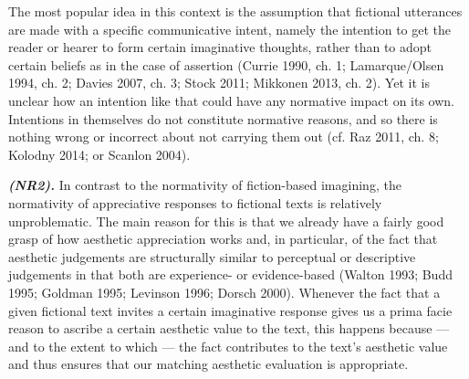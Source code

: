 The most popular idea in this context is the assumption that fictional utterances are made with a specific communicative intent, namely the intention to get the reader or hearer to form certain imaginative thoughts, rather than to adopt certain beliefs as in the case of assertion (Currie 1990, ch. 1; Lamarque/Olsen 1994, ch. 2; Davies 2007, ch. 3; Stock 2011; Mikkonen 2013, ch. 2). Yet it is unclear how an intention like that could have any normative impact on its own. Intentions in themselves do not constitute normative reasons, and so there is nothing wrong or incorrect about not carrying them out (cf. Raz 2011, ch. 8; Kolodny 2014; or Scanlon 2004).

\vspace{.2cm}
\noindent\textbf{\emph{(NR2).}} In contrast to the normativity of fiction-based imagining, the normativity of appreciative responses to fictional texts is relatively unproblematic. The main reason for this is that we already have a fairly good grasp of how aesthetic appreciation works and, in particular, of the fact that aesthetic judgements are structurally similar to perceptual or descriptive judgements in that both are experience- or evidence-based (Walton 1993; Budd 1995; Goldman 1995; Levinson 1996; Dorsch 2000). Whenever the fact that a given fictional text invites a certain imaginative response gives us a prima facie reason to ascribe a certain aesthetic value to the text, this happens because --- and to the extent to which --- the fact contributes to the text's aesthetic value and thus ensures that our matching aesthetic evaluation is appropriate.

